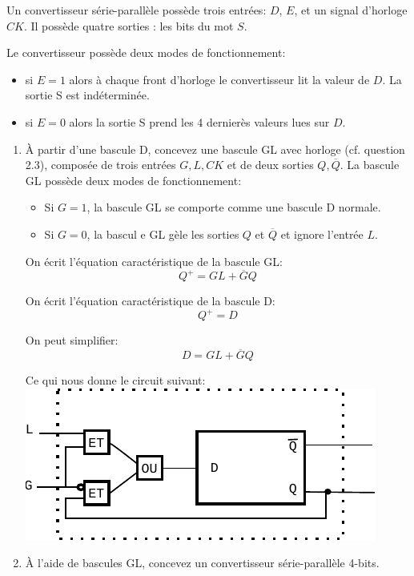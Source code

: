 \documentclass[a4paper,10pt]{exam}
\begin{document}
Un convertisseur série-parallèle possède trois entrées: $D$, $E$, et
un signal d'horloge $CK$. Il possède quatre sorties : les bits du mot $S$.

  Le convertisseur possède deux modes de fonctionnement:
  \begin{itemize}
  \item si $E=1$ alors à chaque front d'horloge le convertisseur lit la valeur
    de $D$. La sortie S est indéterminée.
  \item si $E=0$ alors la sortie S prend les 4 dernierès valeurs lues sur $D$.
  \end{itemize}


\begin{enumerate}
\item À partir d'une bascule D, concevez une bascule GL avec horloge
  (cf. question 2.3), composée de trois entrées $G,L,CK$ et de deux sorties $Q,
  \overline{Q}$. La bascule GL possède deux modes de fonctionnement:
  \begin{itemize}
    \item Si $G=1$, la bascule GL se comporte comme une bascule D normale.
    \item Si $G=0$, la bascul
e GL gèle les sorties $Q$ et $\overline{Q}$ et
      ignore l'entrée $L$.
  \end{itemize}

\begin{solution}
  On écrit l'équation caractéristique de la bascule GL:
  $$ Q^+ = GL + \overline{G}Q $$

  On écrit l'équation caractéristique de la bascule D:
  $$ Q^+ = D $$

  On peut simplifier: $$ D = GL + \overline{G}Q$$

  Ce qui nous donne le circuit suivant:
  \includegraphics{TD8-GLD}
\end{solution}

\item À l'aide de bascules GL, concevez un convertisseur série-parallèle 4-bits.


\end{enumerate}
\end{document}
